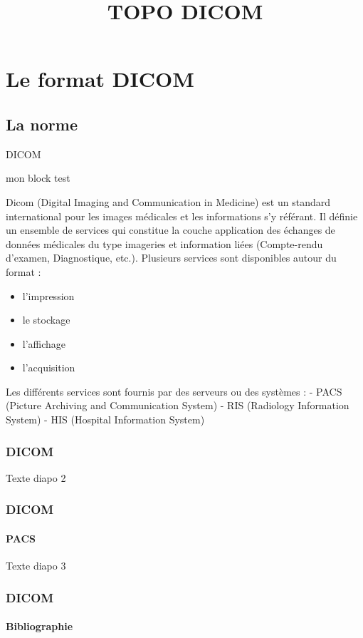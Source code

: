 \documentclass[t, 8pt]{beamer}
\begin{document}
\title{TOPO DICOM}
\section{Le format DICOM}
\subsection{La norme}

\begin{frame}{DICOM}
\begin{block}{mon block}
test
\end{block}
Dicom (Digital Imaging and Communication in Medicine) est un standard international pour les images médicales et les informations s'y référant. Il définie un ensemble de services qui constitue la couche application des échanges de données médicales du type imageries et information liées (Compte-rendu d'examen, Diagnostique, etc.). \cite{nema15:_dicom_ps3}
Plusieurs services sont disponibles autour du format :
\begin{itemize}
\item[\ding{213}] l'impression
\item[\ding{213}] le stockage
\item[\ding{213}] l'affichage
\item[\ding{213}] l'acquisition
\end{itemize}
Les différents services sont fournis par des serveurs ou des systèmes :
- PACS (Picture Archiving and Communication System)
- RIS (Radiology Information System)
- HIS (Hospital Information System)
\end{frame}

\begin{frame}[fragile]
\frametitle{DICOM}
Texte diapo 2
\end{frame}

\begin{frame}[b]
\frametitle{DICOM}
\framesubtitle{PACS}
Texte diapo 3
\end{frame}

\begin{frame}[b]
\frametitle{DICOM}
\framesubtitle{Bibliographie}


\end{frame}
\end{document}
